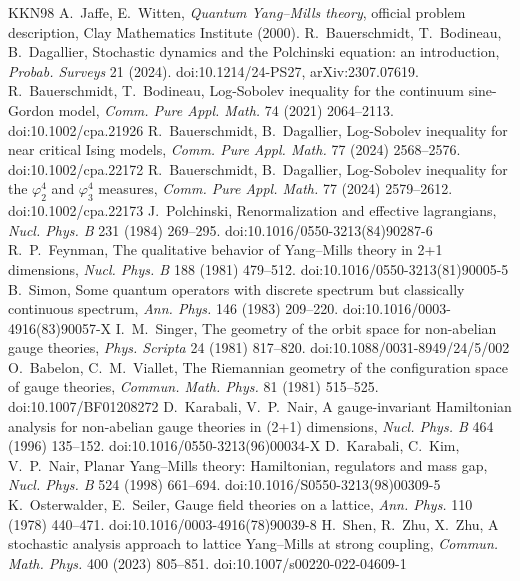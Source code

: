 \documentclass[11pt,a4paper]{article}
\begin{document}
\begin{thebibliography}{KKN98}
\small
{} A.~Jaffe, E.~Witten, \emph{Quantum Yang--Mills theory}, official problem description, Clay Mathematics Institute (2000).
 R.~Bauerschmidt, T.~Bodineau, B.~Dagallier, Stochastic dynamics and the Polchinski equation: an introduction, \emph{Probab. Surveys} 21 (2024). doi:10.1214/24-PS27, arXiv:2307.07619.
 R.~Bauerschmidt, T.~Bodineau, Log-Sobolev inequality for the continuum sine-Gordon model, \emph{Comm. Pure Appl. Math.} 74 (2021) 2064--2113. doi:10.1002/cpa.21926
 R.~Bauerschmidt, B.~Dagallier, Log-Sobolev inequality for near critical Ising models, \emph{Comm. Pure Appl. Math.} 77 (2024) 2568--2576. doi:10.1002/cpa.22172
 R.~Bauerschmidt, B.~Dagallier, Log-Sobolev inequality for the $\varphi^4_2$ and $\varphi^4_3$ measures, \emph{Comm. Pure Appl. Math.} 77 (2024) 2579--2612. doi:10.1002/cpa.22173
 J.~Polchinski, Renormalization and effective lagrangians, \emph{Nucl. Phys. B} 231 (1984) 269--295. doi:10.1016/0550-3213(84)90287-6
 R.~P.~Feynman, The qualitative behavior of Yang--Mills theory in 2+1 dimensions, \emph{Nucl. Phys. B} 188 (1981) 479--512. doi:10.1016/0550-3213(81)90005-5
 B.~Simon, Some quantum operators with discrete spectrum but classically continuous spectrum, \emph{Ann. Phys.} 146 (1983) 209--220. doi:10.1016/0003-4916(83)90057-X
 I.~M.~Singer, The geometry of the orbit space for non-abelian gauge theories, \emph{Phys. Scripta} 24 (1981) 817--820. doi:10.1088/0031-8949/24/5/002
 O.~Babelon, C.~M.~Viallet, The Riemannian geometry of the configuration space of gauge theories, \emph{Commun. Math. Phys.} 81 (1981) 515--525. doi:10.1007/BF01208272
 D.~Karabali, V.~P.~Nair, A gauge-invariant Hamiltonian analysis for non-abelian gauge theories in (2+1) dimensions, \emph{Nucl. Phys. B} 464 (1996) 135--152. doi:10.1016/0550-3213(96)00034-X
 D.~Karabali, C.~Kim, V.~P.~Nair, Planar Yang--Mills theory: Hamiltonian, regulators and mass gap, \emph{Nucl. Phys. B} 524 (1998) 661--694. doi:10.1016/S0550-3213(98)00309-5
 K.~Osterwalder, E.~Seiler, Gauge field theories on a lattice, \emph{Ann. Phys.} 110 (1978) 440--471. doi:10.1016/0003-4916(78)90039-8
 H.~Shen, R.~Zhu, X.~Zhu, A stochastic analysis approach to lattice Yang--Mills at strong coupling, \emph{Commun. Math. Phys.} 400 (2023) 805--851. doi:10.1007/s00220-022-04609-1

\end{thebibliography}
\end{document}
